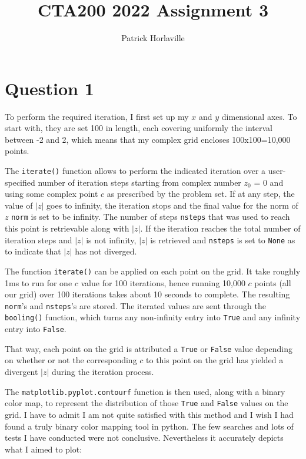 \documentclass{article}
\title{CTA200 2022 Assignment 3}
\author{Patrick Horlaville}
\date{}
\begin{document}
\maketitle


\section*{Question 1}

To perform the required iteration, I first set up my $x$ and $y$ dimensional axes. To start with, they are set 100 in length, each covering uniformly the interval between -2 and 2, which means that my complex grid encloses 100x100=10,000 points. 

The \texttt{iterate()} function allows to perform the indicated iteration over a user-specified number of iteration steps starting from complex number $z_0$ = 0 and using some complex point $c$ as prescribed by the problem set. If at any step, the value of $\lvert z \rvert$ goes to infinity, the iteration stops and the final value for the norm of $z$ \texttt{norm} is set to be infinity. The number of steps \texttt{nsteps} that was used to reach this point is retrievable along with $\lvert z \rvert$. If the iteration reaches the total number of iteration steps and $\lvert z \rvert$ is not infinity, $\lvert z \rvert$ is retrieved and \texttt{nsteps} is set to \texttt{None} as to indicate that $\lvert z \rvert$ has not diverged. 

The function \texttt{iterate()} can be applied on each point on the grid. It take roughly 1ms to run for one $c$ value for 100 iterations, hence running 10,000 $c$ points (all our grid) over 100 iterations takes about 10 seconds to complete. The resulting \texttt{norm}'s and \texttt{nsteps}'s are stored. The iterated values are sent through the \texttt{booling()} function, which turns any non-infinity entry into \texttt{True} and any infinity entry into \texttt{False}. 

That way, each point on the grid is attributed a \texttt{True} or \texttt{False} value depending on whether or not the corresponding $c$ to this point on the grid has yielded a divergent $\lvert z \rvert$ during the iteration process.

The \texttt{matplotlib.pyplot.contourf} function is then used, along with a binary color map, to represent the distribution of those \texttt{True} and \texttt{False} values on the grid. I have to admit I am not quite satisfied with this method and I wish I had found a truly binary color mapping tool in python. The few searches and lots of tests I have conducted were not conclusive. Nevertheless it accurately depicts what I aimed to plot:
\end{document}

